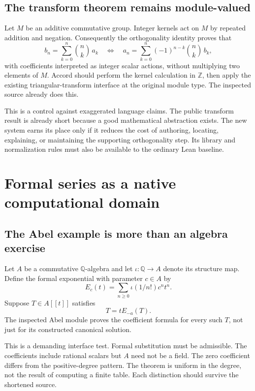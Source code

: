 \documentclass[11pt,letterpaper]{article}
\newcommand{\Z}{\mathbb Z}
\newcommand{\Q}{\mathbb Q}
\theoremstyle{definition}
\begin{document}
\subsection{The transform theorem remains module-valued}
Let \(M\) be an additive commutative group. Integer kernels act on \(M\) by repeated
addition and negation. Consequently the orthogonality identity proves that
\[
 b_n=\sum_{k=0}^{n}\binom nk\,a_k
 \quad\Longleftrightarrow\quad
 a_n=\sum_{k=0}^{n}(-1)^{n-k}\binom nk\,b_k,
\]
with coefficients interpreted as integer scalar actions, without multiplying two
elements of \(M\). Accord should perform the kernel calculation in \(\Z\), then
apply the existing triangular-transform interface at the original module type.
The inspected source already does this\cite{pbinomial}.

This is a control against exaggerated language claims. The public transform
result is already short because a good mathematical abstraction exists. The new
system earns its place only if it reduces the cost of authoring, locating,
explaining, or maintaining the supporting orthogonality step. Its library and
normalization rules must also be available to the ordinary Lean baseline.

\section{Formal series as a native computational domain}\label{sec:series}
\subsection{The Abel example is more than an algebra exercise}
Let \(A\) be a commutative \(\Q\)-algebra and let \(\iota:\Q\to A\) denote its
structure map. Define the formal exponential with parameter \(c\in A\) by
\[
 E_c(t)=\sum_{n\ge0}\iota(1/n!)c^nt^n.
\]
Suppose \(T\in A[\![ t]\!]\) satisfies
\begin{equation}\label{eq:abel}
 T=tE_{-a}(T).
\end{equation}
The inspected Abel module proves the coefficient formula for every such \(T\),
not just for its constructed canonical solution\cite{pabel}.

This is a demanding interface test. Formal substitution must be admissible.
The coefficients include rational scalars but \(A\) need not be a field.
The zero coefficient differs from the positive-degree pattern. The theorem is
uniform in the degree, not the result of computing a finite table. Each distinction
should survive the shortened source.
\end{document}
